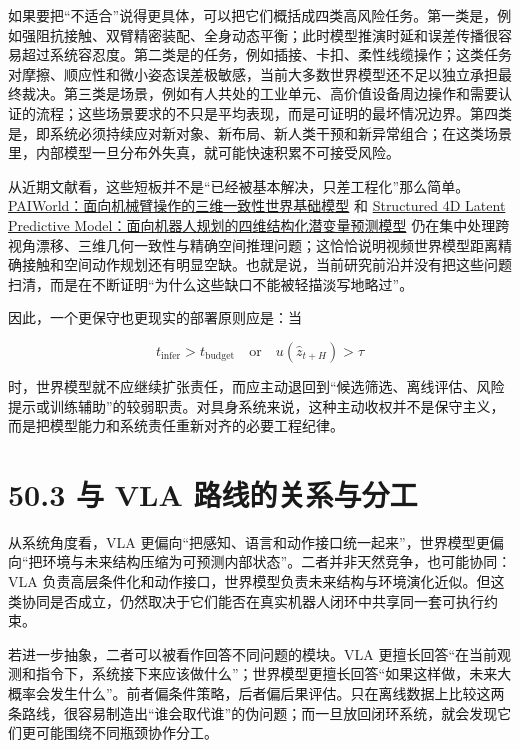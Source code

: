 如果要把“不适合”说得更具体，可以把它们概括成四类高风险任务。第一类是\texttt{}，例如强阻抗接触、双臂精密装配、全身动态平衡；此时模型推演时延和误差传播很容易超过系统容忍度。第二类是\texttt{}的任务，例如插接、卡扣、柔性线缆操作；这类任务对摩擦、顺应性和微小姿态误差极敏感，当前大多数世界模型还不足以独立承担最终裁决。第三类是\texttt{}场景，例如有人共处的工业单元、高价值设备周边操作和需要认证的流程；这些场景要求的不只是平均表现，而是可证明的最坏情况边界。第四类是\texttt{}，即系统必须持续应对新对象、新布局、新人类干预和新异常组合；在这类场景里，内部模型一旦分布外失真，就可能快速积累不可接受风险。

从近期文献看，这些短板并不是“已经被基本解决，只差工程化”那么简单。\href{https://arxiv.org/abs/2606.18375}{PAIWorld：面向机械臂操作的三维一致性世界基础模型} 和 \href{https://arxiv.org/abs/2607.01166}{Structured 4D Latent Predictive Model：面向机器人规划的四维结构化潜变量预测模型} 仍在集中处理跨视角漂移、三维几何一致性与精确空间推理问题；这恰恰说明视频世界模型距离精确接触和空间动作规划还有明显空缺。也就是说，当前研究前沿并没有把这些问题扫清，而是在不断证明“为什么这些缺口不能被轻描淡写地略过”。

因此，一个更保守也更现实的部署原则应是：当

\begingroup
\footnotesize
\begin{equation*}
t_{\mathrm{infer}} > t_{\mathrm{budget}}
\quad \text{or} \quad
u(\hat{z}_{t+H}) > \tau
\end{equation*}
\endgroup

时，世界模型就不应继续扩张责任，而应主动退回到“候选筛选、离线评估、风险提示或训练辅助”的较弱职责。对具身系统来说，这种主动收权并不是保守主义，而是把模型能力和系统责任重新对齐的必要工程纪律。

\section*{50.3 与 VLA 路线的关系与分工}


从系统角度看，VLA 更偏向“把感知、语言和动作接口统一起来”，世界模型更偏向“把环境与未来结构压缩为可预测内部状态”。二者并非天然竞争，也可能协同：VLA 负责高层条件化和动作接口，世界模型负责未来结构与环境演化近似。但这类协同是否成立，仍然取决于它们能否在真实机器人闭环中共享同一套可执行约束。

若进一步抽象，二者可以被看作回答不同问题的模块。VLA 更擅长回答“在当前观测和指令下，系统接下来应该做什么”；世界模型更擅长回答“如果这样做，未来大概率会发生什么”。前者偏条件策略，后者偏后果评估。只在离线数据上比较这两条路线，很容易制造出“谁会取代谁”的伪问题；而一旦放回闭环系统，就会发现它们更可能围绕不同瓶颈协作分工。

